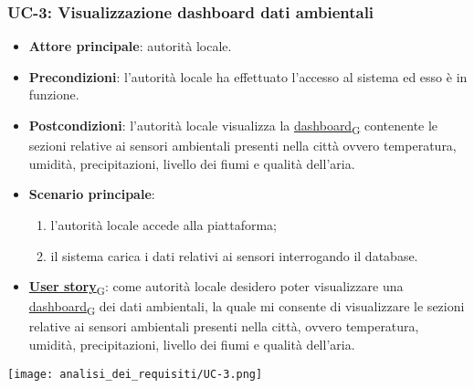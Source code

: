 \newpage
\subsubsection{UC-3: Visualizzazione dashboard dati ambientali}
\begin{itemize}
	\item \textbf{Attore principale}: autorità locale.
	\item \textbf{Precondizioni}: l'autorità locale ha effettuato l'accesso al sistema ed esso è in funzione.
	\item \textbf{Postcondizioni}: l'autorità locale visualizza la \href{https://7last.github.io/docs/pb/documentazione-interna/glossario\#dashboard}{dashboard\textsubscript{G}} contenente le sezioni relative ai sensori ambientali presenti nella città ovvero temperatura, umidità, precipitazioni, livello dei fiumi e qualità dell'aria.
	\item \textbf{Scenario principale}:
	      \begin{enumerate}
		      \item l'autorità locale accede alla piattaforma;
		      \item il sistema carica i dati relativi ai sensori interrogando il database.
	      \end{enumerate}
	\item \href{https://7last.github.io/docs/pb/documentazione-interna/glossario\#user-story}{\textbf{User story}\textsubscript{G}}: come autorità locale desidero poter visualizzare una \href{https://7last.github.io/docs/pb/documentazione-interna/glossario\#dashboard}{dashboard\textsubscript{G}} dei dati ambientali, la quale mi consente di visualizzare le sezioni relative ai sensori ambientali presenti nella città, ovvero temperatura, umidità, precipitazioni, livello dei fiumi e qualità dell'aria.
\end{itemize}
\begin{center}
	\texttt{[image: analisi\_dei\_requisiti/UC-3.png]}
\end{center}

